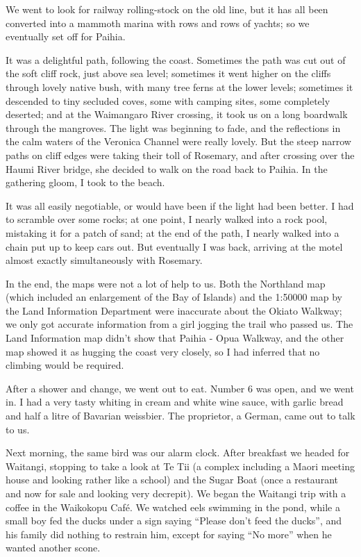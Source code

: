 \documentclass[12pt,a4paper]{article}
\begin{document}
We went to look for railway rolling-stock on the old line, but it has all
been converted into a mammoth marina with rows and rows of yachts; so we
eventually set off for Paihia.

It was a delightful path, following the coast. Sometimes the path was cut 
out of the soft cliff rock, just above sea level; sometimes it went higher
on the cliffs through lovely native bush, with many tree ferns at the lower
levels; sometimes it descended to tiny secluded coves, some with camping
sites, some completely deserted; and at the Waimangaro River crossing, it 
took us on a long boardwalk through the mangroves. The light was beginning
to fade, and the reflections in the calm waters of the Veronica Channel were
really lovely. But the steep narrow paths on cliff edges were taking their toll
of Rosemary, and after crossing over the Haumi River bridge, she decided to
walk on the road back to Paihia. In the gathering gloom, I took to the beach.

It was all easily negotiable, or would have been if the light had been better.
I had to scramble over some rocks; at one point, I nearly walked into a
rock pool, mistaking it for a patch of sand; at the end of the path, I
nearly walked into a chain put up to keep cars out. But eventually I was
back, arriving at the motel almost exactly simultaneously with Rosemary.

In the end, the maps were not a lot of help to us. Both the Northland map
(which included an enlargement of the Bay of Islands) and the 1:50000 map
by the Land Information Department were inaccurate about the Okiato Walkway;
we only got accurate information from a girl jogging the trail who passed us.
The Land Information map didn't show that Paihia - Opua Walkway, and the
other map showed it as hugging the coast very closely, so I had inferred
that no climbing would be required.

After a shower and change, we went out to eat. Number 6 was open, and we
went in. I had a very tasty whiting in cream and white wine sauce, with
garlic bread and half a litre of Bavarian weissbier. The proprietor, a German,
came out to talk to us.

Next morning, the same bird was our alarm clock. After breakfast we headed 
for Waitangi, stopping to take a look at Te Tii (a complex including a Maori
meeting house and looking rather like a school) and the Sugar Boat (once a
restaurant and now for sale and looking very decrepit). We began the 
Waitangi trip with a coffee in the Waikokopu Caf\'e. We watched eels 
swimming in the pond, while a small boy fed the ducks under a sign saying 
``Please don't feed the ducks'', and his family did nothing to restrain him, 
except for saying ``No more'' when he wanted another scone.
\end{document}
